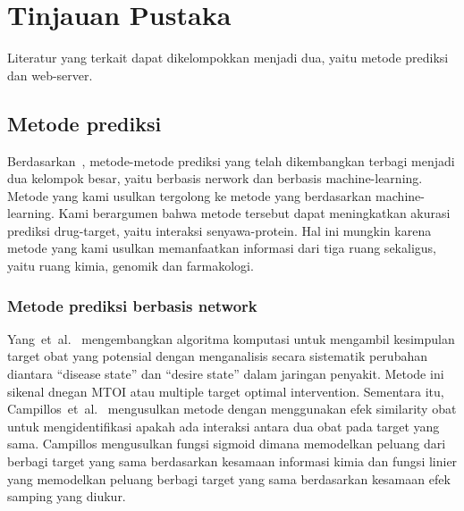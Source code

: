 \chapter{Tinjauan Pustaka}

Literatur yang terkait dapat dikelompokkan menjadi dua, yaitu metode prediksi dan web-server.

\section{Metode prediksi}
Berdasarkan~\cite{Chen17082015}, metode-metode prediksi yang telah dikembangkan terbagi menjadi dua kelompok besar, yaitu berbasis nerwork dan berbasis machine-learning.
Metode yang kami usulkan tergolong ke metode yang berdasarkan machine-learning.
Kami berargumen bahwa metode tersebut dapat meningkatkan akurasi prediksi drug-target, yaitu interaksi senyawa-protein.
Hal ini mungkin karena metode yang kami usulkan memanfaatkan informasi dari tiga ruang sekaligus, yaitu ruang kimia, genomik dan farmakologi.

\subsection{Metode prediksi berbasis network}
Yang~et~al.~\cite{yang} mengembangkan algoritma komputasi untuk mengambil kesimpulan target obat yang potensial dengan menganalisis secara sistematik perubahan diantara ``disease state'' dan ``desire state'' dalam jaringan penyakit. 
Metode ini sikenal dnegan MTOI atau multiple target optimal intervention. 
Sementara itu, Campillos~et~al.~\cite{campillos} mengusulkan metode dengan  menggunakan efek similarity obat untuk mengidentifikasi apakah ada interaksi antara dua obat pada target yang sama.  
Campillos mengusulkan fungsi sigmoid dimana memodelkan peluang dari berbagi target yang sama berdasarkan kesamaan informasi kimia dan fungsi linier yang memodelkan peluang berbagi target yang sama berdasarkan kesamaan efek samping yang diukur. 

